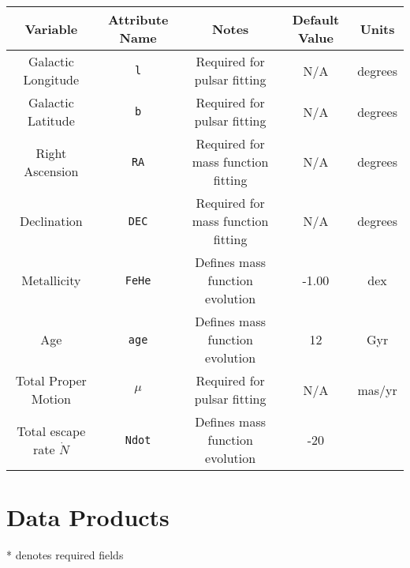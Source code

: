 \documentclass[12pt]{article}
\begin{document}
\begin{center}
\begin{table}[H]
\begin{tabular}{ | c | c | c | c | c | }
    \hline
    Variable & Attribute Name & Notes & Default Value & Units \\
    \hline\hline
    Galactic Longitude & \texttt{l} &
    Required for pulsar fitting & N/A & degrees \\
    \hline
    Galactic Latitude & \texttt{b}  &
    Required for pulsar fitting & N/A & degrees \\
    \hline
    Right Ascension & \texttt{RA} &
    Required for mass function fitting & N/A & degrees \\
    \hline
    Declination & \texttt{DEC}  &
    Required for mass function fitting & N/A & degrees \\
    \hline
    Metallicity & \texttt{FeHe} &
    Defines mass function evolution & -1.00 & dex \\
    \hline
    Age & \texttt{age} & Defines mass function evolution & 12 & Gyr \\
    \hline
    Total Proper Motion & \texttt{\(\mu\)} &
    Required for pulsar fitting & N/A & mas/yr \\
    \hline
    Total escape rate \(\dot{N}\) & \texttt{Ndot} &
    Defines mass function evolution & -20 & \\
    \hline
\end{tabular}
\end{table}
\end{center}



\section{Data Products}

* denotes required fields










\end{document}

